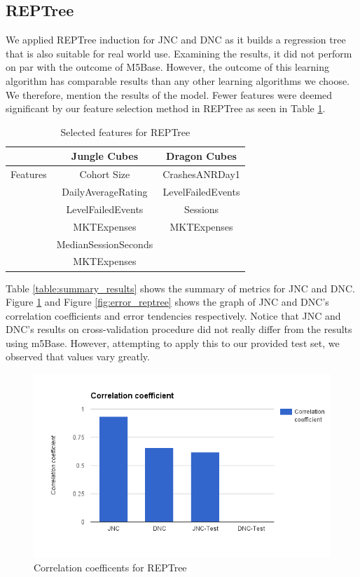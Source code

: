 \subsection{REPTree}
We applied REPTree induction for JNC and DNC as it builds a regression tree that is also suitable for real world use. Examining the results, it did not perform on par with the outcome of M5Base. However, the outcome of this learning algorithm  has comparable results than any other learning algorithms we choose. We therefore, mention the results of the model. Fewer features were deemed significant by our feature selection method in REPTree as seen in Table \ref{table:reptree_features}.

\begin{table}[h]
\centering
\caption{Selected features for REPTree}
\label{table:reptree_features}
\begin{tabular}{|c|c|c|}
\hline 
 & Jungle Cubes & Dragon Cubes\\ 
\hline 
Features & Cohort Size & CrashesANRDay1 
\\& DailyAverageRating & LevelFailedEvents 
\\& LevelFailedEvents & Sessions
\\& MKTExpenses & MKTExpenses
\\& MedianSessionSeconds &  
\\& MKTExpenses &  
\\ 
\hline 
\end{tabular}
\end{table}

Table \ref{table:summary_results} shows the summary of metrics for JNC and DNC. Figure \ref{fig:correl_reptree} and Figure \ref{fig:error_reptree} shows the graph of JNC and DNC's correlation coefficients and error tendencies respectively. Notice that JNC and DNC's results on cross-validation procedure did not really differ from the results using m5Base. However, attempting to apply this to our provided test set, we observed that values vary greatly.

\begin{figure}[h]
\centering
\includegraphics[scale=0.3]{figures/REPTree_1.png} 
\caption{Correlation coefficents for REPTree}
\label{fig:correl_reptree}
\end{figure}

